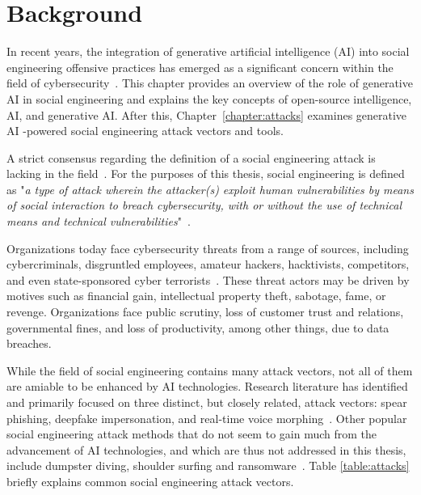 \chapter{Background\label{chapter:background}}
\begin{comment}
\end{comment}


%
%
In recent years, the integration of generative artificial intelligence (AI) into social engineering offensive practices has emerged as a significant concern within the field of cybersecurity~\citep{blauth_AI_Crime_Overview_Malicious_Use_Abuse_2022, king_AI_Crime_Interdisciplinary_Analysis_2019, mirsky_Threat_Offensive_AI_Organizations_2023}. This chapter provides an overview of the role of generative AI in social engineering and explains the key concepts of open-source intelligence, AI, and generative AI. After this, Chapter~\ref{chapter:attacks} examines generative AI -powered social engineering attack vectors and tools.



%
%
A strict consensus regarding the definition of a social engineering attack is lacking in the field~\citep{hatfield_SE_Evolution_Concept_2018}. For the purposes of this thesis, social engineering is defined as "\textit{a type of attack wherein the attacker(s) exploit human vulnerabilities by means of social interaction to breach cybersecurity, with or without the use of technical means and technical vulnerabilities}"~\citep{wang_Defining_Social_Engineering_2020}.



%
%
Organizations today face cybersecurity threats from a range of sources, including cybercriminals, disgruntled employees, amateur hackers, hacktivists, competitors, and even state-sponsored cyber terrorists~\citep{mirsky_Threat_Offensive_AI_Organizations_2023}. These threat actors may be driven by motives such as financial gain, intellectual property theft, sabotage, fame, or revenge. Organizations face public scrutiny, loss of customer trust and relations, governmental fines, and loss of productivity, among other things, due to data breaches.


%
%
While the field of social engineering contains many attack vectors, not all of them are amiable to be enhanced by AI technologies. Research literature has identified and primarily focused on three distinct, but closely related, attack vectors: spear phishing, deepfake impersonation, and real-time voice morphing~\citep{king_AI_Crime_Interdisciplinary_Analysis_2019}. Other popular social engineering attack methods that do not seem to gain much from the advancement of AI technologies, and which are thus not addressed in this thesis, include dumpster diving, shoulder surfing and ransomware~\citep{mirsky_Threat_Offensive_AI_Organizations_2023}. Table \ref{table:attacks} briefly explains common social engineering attack vectors.

